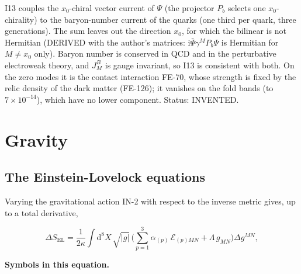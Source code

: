 \documentclass[
  10pt,
]{article}
\begin{document}
I13 couples the \(x_0\)-chiral vector current of \(\Psi\) (the projector
\(P_b\) selects one \(x_0\)-chirality) to the baryon-number current of
the quarks (one third per quark, three generations). The sum leaves out
the direction \(x_0\), for which the bilinear is not Hermitian (DERIVED
with the author's matrices: \(\mathrm{i}\bar\Psi\gamma^MP_b\Psi\) is
Hermitian for \(M \ne x_0\) only). Baryon number is conserved in QCD and
in the perturbative electroweak theory, and \(J^B_M\) is gauge
invariant, so I13 is consistent with both. On the zero modes it is the
contact interaction FE-70, whose strength is fixed by the relic density
of the dark matter (FE-126); it vanishes on the fold bands (to
\(7\times10^{-14}\)), which have no lower component. Status: INVENTED.

\hypertarget{gravity-1}{%
\section{Gravity}\label{gravity-1}}

\hypertarget{the-einstein-lovelock-equations}{%
\subsection{The Einstein-Lovelock
equations}\label{the-einstein-lovelock-equations}}

Varying the gravitational action IN-2 with respect to the inverse metric
gives, up to a total derivative,

\[
\Delta S_{\mathrm{EL}} = \frac{1}{2\kappa}\int\mathrm{d}^8X\,\sqrt{\lvert g\rvert}\,\Big(\sum_{p=1}^{3}\alpha_{(p)}\,\mathcal{E}_{(p)MN}
 + \Lambda\,g_{MN}\Big)\Delta g^{MN},
\]

\textbf{Symbols in this equation.}
\end{document}
